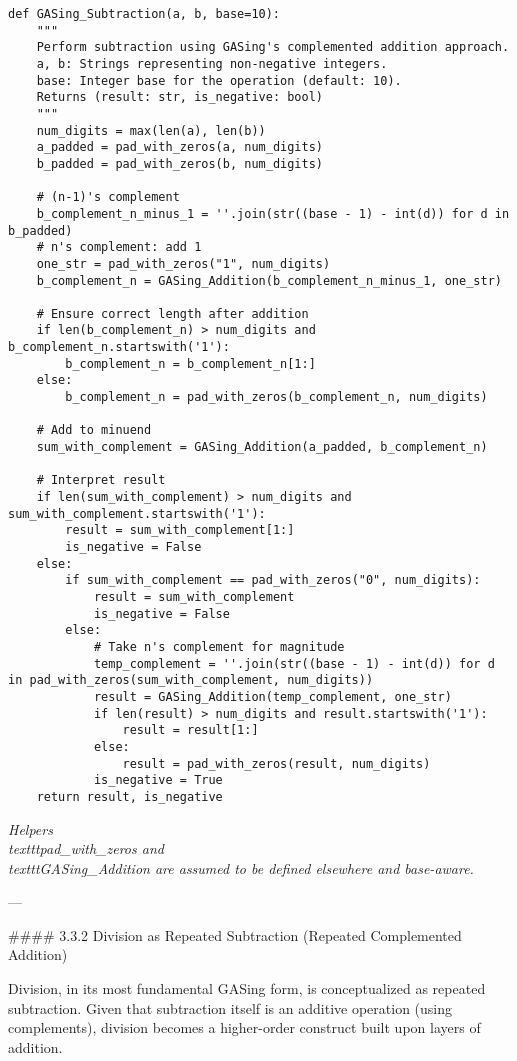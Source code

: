 \begin{verbatim}
def GASing_Subtraction(a, b, base=10):
    """
    Perform subtraction using GASing's complemented addition approach.
    a, b: Strings representing non-negative integers.
    base: Integer base for the operation (default: 10).
    Returns (result: str, is_negative: bool)
    """
    num_digits = max(len(a), len(b))
    a_padded = pad_with_zeros(a, num_digits)
    b_padded = pad_with_zeros(b, num_digits)

    # (n-1)'s complement
    b_complement_n_minus_1 = ''.join(str((base - 1) - int(d)) for d in b_padded)
    # n's complement: add 1
    one_str = pad_with_zeros("1", num_digits)
    b_complement_n = GASing_Addition(b_complement_n_minus_1, one_str)

    # Ensure correct length after addition
    if len(b_complement_n) > num_digits and b_complement_n.startswith('1'):
        b_complement_n = b_complement_n[1:]
    else:
        b_complement_n = pad_with_zeros(b_complement_n, num_digits)

    # Add to minuend
    sum_with_complement = GASing_Addition(a_padded, b_complement_n)

    # Interpret result
    if len(sum_with_complement) > num_digits and sum_with_complement.startswith('1'):
        result = sum_with_complement[1:]
        is_negative = False
    else:
        if sum_with_complement == pad_with_zeros("0", num_digits):
            result = sum_with_complement
            is_negative = False
        else:
            # Take n's complement for magnitude
            temp_complement = ''.join(str((base - 1) - int(d)) for d in pad_with_zeros(sum_with_complement, num_digits))
            result = GASing_Addition(temp_complement, one_str)
            if len(result) > num_digits and result.startswith('1'):
                result = result[1:]
            else:
                result = pad_with_zeros(result, num_digits)
            is_negative = True
    return result, is_negative

\end{verbatim}

\emph{Helpers \\texttt{pad\_with\_zeros} and \\texttt{GASing\_Addition} are assumed to be defined elsewhere and base-aware.}

---

\#### 3.3.2 Division as Repeated Subtraction (Repeated Complemented Addition)

Division, in its most fundamental GASing form, is conceptualized as repeated subtraction. Given that subtraction itself is an additive operation (using complements), division becomes a higher-order construct built upon layers of addition.

